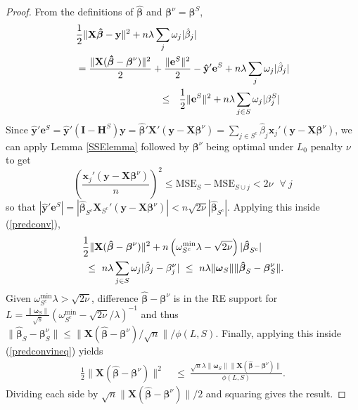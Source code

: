 \documentclass[12pt]{article}
\newcommand{\bs}[1]{\boldsymbol{#1}}
\newcommand{\mr}[1]{\mathrm{#1}}
\newcommand{\bm}[1]{\mathbf{#1}}
\begin{document}
\begin{proof}
From the definitions of $\bs{\hat\beta}$ and $\bs{\beta}^\nu = \bs{\beta}^S$, 
\begin{align}\label{predconv}&
\frac{1}{2}\|\bm{X}\bs{\hat \beta}-\bm{y}\|^2 +  n\lambda\sum_j\omega_j|\hat\beta_j|  \\ &= \frac{\|\bm{X}(\bs{\hat\beta}-\bs{\beta}^\nu)\|^2}{2} + \frac{\|\bm{e}^S\|^2}{2} - \bm{\hat y}'\bm{e}^S+ n\lambda\sum_j\omega_j|\hat\beta_j|\notag\\
&\hspace{3cm}\leq~~\frac{1}{2}\|\bm{e}^S\|^2 + n\lambda\sum_{j\in S}\omega_j|\beta^S_j|\notag
\end{align}
  Since $\bm{\hat y}'\bm{e}^S = \bm{\hat y}'(\bm{I}-\bm{H}^S)\bm{y} =
\bs{\hat\beta}'\bm{X}'(\bm{y}-\bm{X}\bs{\beta}^\nu) = 
\sum_{j\in S^c} \hat\beta_j\bs{x}_j'(\bm{y}-\bm{X}\bs{\beta}^\nu)
$,
 we can apply Lemma \ref{SSElemma} followed by $\bs{\beta}^\nu$ being optimal under $L_0$ penalty $\nu$ to get 
\begin{equation} \label{L0ineq}
\left(\frac{\bs{x}_j'(\bm{y}-\bm{X}\bs{\beta}^\nu)}{n}\right)^2
\leq \mr{MSE}_S - \mr{MSE}_{S\cup j} < 2\nu ~~~\forall~j
\end{equation}
so that $|\bm{\hat y}'\bm{e}^S| = |\bs{\hat\beta}_{S^c}\bm{X}_{S^c}'(\bm{y}-\bm{X}\bs{\beta}^\nu)| < n\sqrt{2\nu}|\bs{\hat\beta}_{S^c}|$.  Applying this inside (\ref{predconv}),
\begin{align}\label{predconvineq}&
\frac{1}{2}\|\bm{X}(\bs{\hat\beta}-\bs{\beta}^\nu)\|^2
  + n\left(\omega^{\mr{min}}_{S^c}\lambda-\sqrt{2\nu}\right)|\bs{\hat\beta}_{S^c}|\\
  &~\leq~ n\lambda\sum_{j\in S}\omega_j|\hat\beta_{j}-\beta^\nu_j|
  ~\leq~ n\lambda\|\bs{\omega}_S\|\|\bs{\hat\beta}_{S}-\bs{\beta}^\nu_S\|.\notag
\end{align}
Given $\omega^{\mr{min}}_{S^c}\lambda > \sqrt{2\nu}$,
difference $\bs{\hat\beta}-\bs{\beta}^\nu$ is in the RE support for 
$L=\frac{\|\bs{\omega}_S\|}{\sqrt{s}}(\omega^{\mr{min}}_{S^c}-\sqrt{2\nu}/\lambda)^{-1}$ and thus $\|\bs{\hat\beta}_{S}-\bs{\beta}^\nu_S\| \leq \|\bm{X}(\bs{\hat\beta}-\bs{\beta}^\nu)/\sqrt{n}\|/\phi(L,S)$.  Finally, applying this inside (\ref{predconvineq}) yields
\begin{align}
\frac{1}{2}\|\bm{X}(\bs{\hat\beta}-\bs{\beta}^\nu)\|^2
  &~\leq~ \frac{\sqrt{n}\lambda\|\bs{\omega}_S\|\|\bm{X}(\bs{\hat\beta}-\bs{\beta}^\nu)\|}
  {\phi(L, S)}.
\end{align}
Dividing each side by $\sqrt{n}\|\bm{X}(\bs{\hat\beta}-\bs{\beta}^\nu)\|/2$ and squaring gives the result.
\end{proof}
\end{document}

